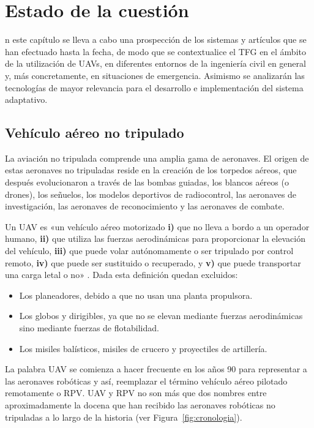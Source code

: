 \chapter{Estado de la cuestión}
\label{chap:antecedentes}

n este capítulo se lleva a cabo una prospección de los sistemas y artículos
que se han efectuado hasta la fecha, de modo que se contextualice el \acs{TFG} en el ámbito 
de la utilización de \acs{UAV}s, en diferentes entornos de la ingeniería civil en general y, más
concretamente, en situaciones de emergencia. Asimismo se analizarán las tecnologías de mayor 
relevancia para el desarrollo e implementación del sistema adaptativo.  

\section{Vehículo aéreo no tripulado}
\label{sec:vehiculonotripulado}

La aviación no tripulada comprende una amplia gama de aeronaves. El origen de estas aeronaves no tripuladas reside 
en la creación de los torpedos aéreos, que después evolucionaron a través de las bombas guiadas, los blancos 
aéreos (o drones), los señuelos, los modelos deportivos de radiocontrol, las aeronaves de investigación, 
las aeronaves de reconocimiento y las aeronaves de combate.

Un \acs{UAV} es «un vehículo aéreo motorizado \textbf{i)} que no lleva a bordo a un operador humano, 
\textbf{ii)} que utiliza las fuerzas aerodinámicas para proporcionar la elevación del vehículo, \textbf{iii)} que puede volar autónomamente 
o ser tripulado por control remoto, \textbf{iv)} que puede ser sustituido o recuperado, y \textbf{v)} que puede transportar una 
carga letal o no» \cite{UAV}. Dada esta definición quedan excluidos:

\begin{itemize}
\item Los planeadores, debido a que no usan una planta propulsora.
\item Los globos y dirigibles, ya que no se elevan mediante fuerzas aerodinámicas sino mediante fuerzas de flotabilidad.
\item Los misiles balísticos, misiles de crucero y proyectiles de artillería.
\end{itemize}

La palabra \acs{UAV} se comienza a hacer frecuente en los años 90 para representar a las aeronaves robóticas 
y así, reemplazar el término vehículo aéreo pilotado remotamente o \acs{RPV}. \acs{UAV} y \acs{RPV} no son más 
que dos nombres entre aproximadamente la docena que han recibido las aeronaves robóticas no tripuladas a lo largo de la historia (ver Figura~\ref{fig:cronologia}).

